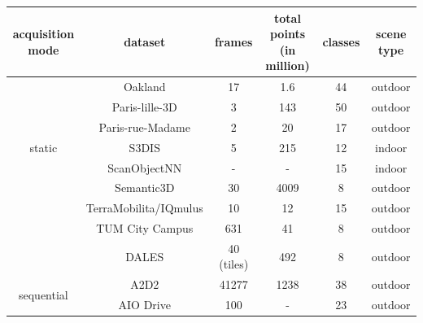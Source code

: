     \begin{table}[h!]
        \begin{tabular}{c|c|c|c|c|c}%
            \hline
            acquisition mode & dataset & frames & total points (in million) & classes & scene type \\  %
            \hline
            \multirow{7}{*}{static} & Oakland\cite{oakland} & 17 & 1.6 &  44 & outdoor \\ %
                                    & Paris-lille-3D\cite{roynard2018paris} & 3 & 143 & 50 & outdoor \\ %
                                    & Paris-rue-Madame\cite{paris_rue_madame} & 2 & 20 & 17 & outdoor \\ %
                                    & S3DIS\cite{Armeni_2016_CVPR_S3DIS} & 5 & 215 & 12 & indoor \\ %
                                    & ScanObjectNN\cite{scanobejctnn} & - & - & 15 & indoor \\ %
                                    & Semantic3D\cite{hackel2017semantic3d} & 30 & 4009 & 8 & outdoor \\ %
                                    & TerraMobilita/IQmulus\cite{TerraMobilita} & 10 & 12 & 15 & outdoor\\ %
                                    & TUM City Campus\cite{gehrung2017approach_tum_campus} & 631 & 41 & 8 & outdoor\\ %
                                    & DALES\cite{varney2020dales} & 40 (tiles) & 492 & 8 & outdoor\\ %
            \hline
            \multirow{7}{*}{sequential} & A2D2\cite{geyer2020a2d2} & 41277 & 1238 & 38 & outdoor\\ %
                                        & AIO Drive\cite{Weng2020_AIODrive} & 100& - & 23 & outdoor\\ %

\end{tabular}
\end{table}

